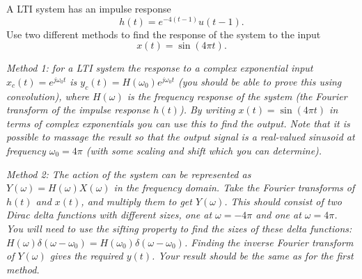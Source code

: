 A LTI system has an impulse response
\begin{equation*}
  h(t) = e^{-4(t - 1)} u(t-1).
\end{equation*}
Use two different methods to find the response of the system to
the input
\begin{equation*}
  x(t) = \sin(4 \pi t).
\end{equation*}

{\it Method 1:  for a LTI system the response to a complex
exponential input $x_c(t) = e^{j \omega_0 t}$ is $y_c(t) =
H(\omega_0) e^{j \omega_0 t}$ (you should be able to prove this
using convolution), where $H(\omega)$ is the frequency response of
the system (the Fourier transform of the impulse response $h(t)$).
By writing $x(t) = \sin(4 \pi t)$ in terms of complex exponentials
you can use this to find the output.  Note that it is possible to
massage the result so that the output signal is a real-valued
sinusoid at frequency $\omega_0 = 4 \pi$ (with some scaling and
shift which you can determine).}
\newline

{\it Method 2:  The action of the system can be represented as
$Y(\omega) = H(\omega) X(\omega)$ in the frequency domain.  Take
the Fourier transforms of $h(t)$ and $x(t)$, and multiply them to
get $Y(\omega)$.  This should consist of two Dirac delta functions
with different sizes, one at $\omega = -4 \pi$ and one at $\omega
= 4 \pi$.  You will need to use the sifting property to find the
sizes of these delta functions:  $H(\omega) \delta(\omega -
\omega_0) = H(\omega_0) \delta(\omega - \omega_0)$.  Finding the
inverse Fourier transform of $Y(\omega)$ gives the required
$y(t)$.  Your result should be the same as for the first method.}
